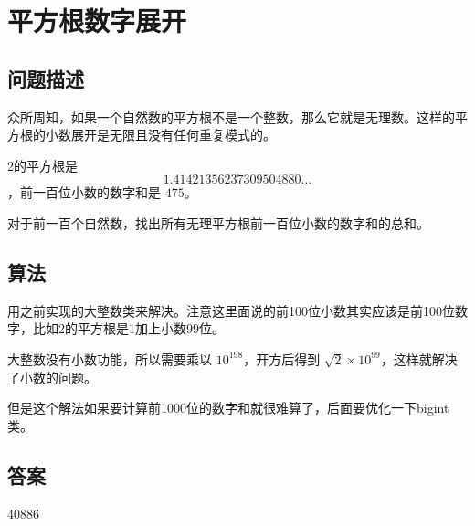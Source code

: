 \section{平方根数字展开}\label{sec:problem80}
\subsection{问题描述}
\begin{tcolorbox}
	众所周知，如果一个自然数的平方根不是一个整数，那么它就是无理数。这样的平方根的小数展开是无限且没有任何重复模式的。

	2的平方根是
	\[1.41421356237309504880 \ldots\]
	，前一百位小数的数字和是 \(475\)。

	对于前一百个自然数，找出所有无理平方根前一百位小数的数字和的总和。

\end{tcolorbox}

\subsection{算法}
用之前实现的大整数类来解决。注意这里面说的前100位小数其实应该是前100位数字，比如2的平方根是1加上小数99位。

大整数没有小数功能，所以需要乘以 $ 10^{198} $，开方后得到 $ \sqrt{2} \times 10^{99} $，这样就解决了小数的问题。

但是这个解法如果要计算前1000位的数字和就很难算了，后面要优化一下bigint类。
\subsection{答案}
40886
